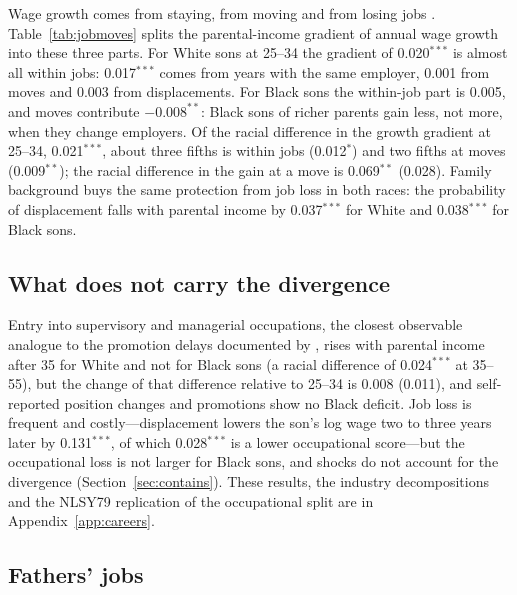 Wage growth comes from staying, from moving and from losing jobs \citep{topel1992job, altonji2013modeling}.
Table~\ref{tab:jobmoves} splits the parental-income gradient of annual wage growth into these three parts. For White
sons at 25--34 the gradient of 0.020$^{***}$ is almost all within jobs: 0.017$^{***}$ comes from years with the same
employer, 0.001 from moves and 0.003 from displacements. For Black sons the within-job part is 0.005, and moves
contribute $-0.008^{**}$: Black sons of richer parents gain less, not more, when they change employers. Of the racial
difference in the growth gradient at 25--34, 0.021$^{***}$, about three fifths is within jobs (0.012$^{*}$) and two fifths
at moves (0.009$^{**}$); the racial difference in the gain at a move is 0.069$^{**}$ (0.028). Family background buys the
same protection from job loss in both races: the probability of displacement falls with parental income by 0.037$^{***}$
for White and 0.038$^{***}$ for Black sons.



\subsection{What does not carry the divergence}

Entry into supervisory and managerial occupations, the closest observable analogue to the promotion delays documented
by \citet{hegde2026racial}, rises with parental income after 35 for White and not for Black sons (a racial difference of
0.024$^{***}$ at 35--55), but the change of that difference relative to 25--34 is 0.008 (0.011), and self-reported
position changes and promotions show no Black deficit. Job loss is frequent and costly---displacement lowers the son's log
wage two to three years later by 0.131$^{***}$, of which 0.028$^{***}$ is a lower occupational score---but the
occupational loss is not larger for Black sons, and shocks do not account for the divergence (Section~\ref{sec:contains}).
These results, the industry decompositions and the NLSY79 replication of the occupational split are in
Appendix~\ref{app:careers}.


\subsection{Fathers' jobs}\label{sec:fathers}

